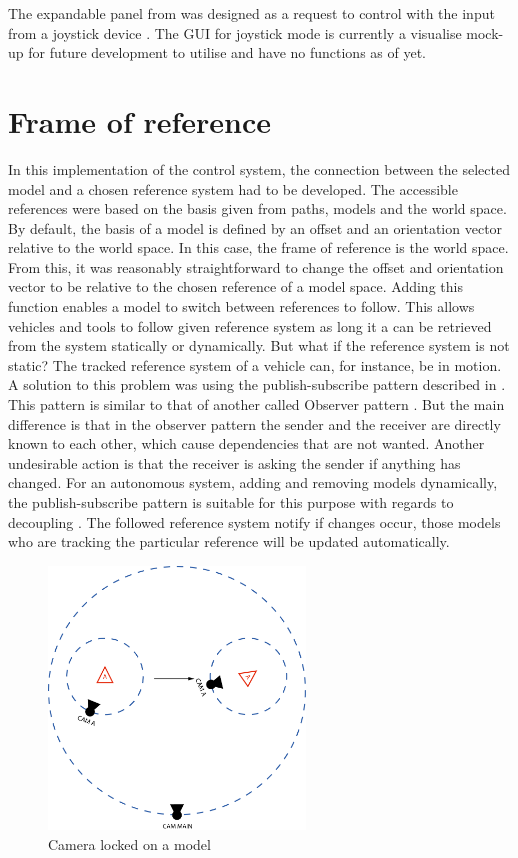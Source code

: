 The expandable panel from  was designed as a request to control with the input from a joystick device \cite{joystick}. The GUI for joystick mode is currently a visualise mock-up for future development to utilise and have no functions as of yet.

\section{Frame of reference}

In this implementation of the control system, the connection between the selected model and a chosen reference system had to be developed. The accessible references were based on the basis given from paths, models and the world space. By default, the basis of a model is defined by an offset and an orientation vector relative to the world space. In this case, the frame of reference is the world space. From this, it was reasonably straightforward to change the offset and orientation vector to be relative to the chosen reference of a model space. Adding this function enables a model to switch between references to follow. This allows vehicles and tools to follow given reference system as long it a can be retrieved from the system statically or dynamically. But what if the reference system is not static? The tracked reference system of a vehicle can, for instance, be in motion. A solution to this problem was using the publish-subscribe pattern described in . This pattern is similar to that of another called Observer pattern \cite{observer_pattern}. But the main difference is that in the observer pattern the sender and the receiver are directly known to each other, which cause dependencies that are not wanted. Another undesirable action is that the receiver is asking the sender if anything has changed. For an autonomous system, adding and removing models dynamically, the publish-subscribe pattern is suitable for this purpose with regards to decoupling \cite{decoupling}. The followed reference system notify if changes occur, those models who are tracking the particular reference will be updated automatically.  

\begin{figure}[ht]
    \centering
    \includegraphics[height=7cm]{images/cam_ex.png}
    \caption[Camera locked on a model]{Camera locked on a model}
    \label{fig:cam_ex}
\end{figure}

